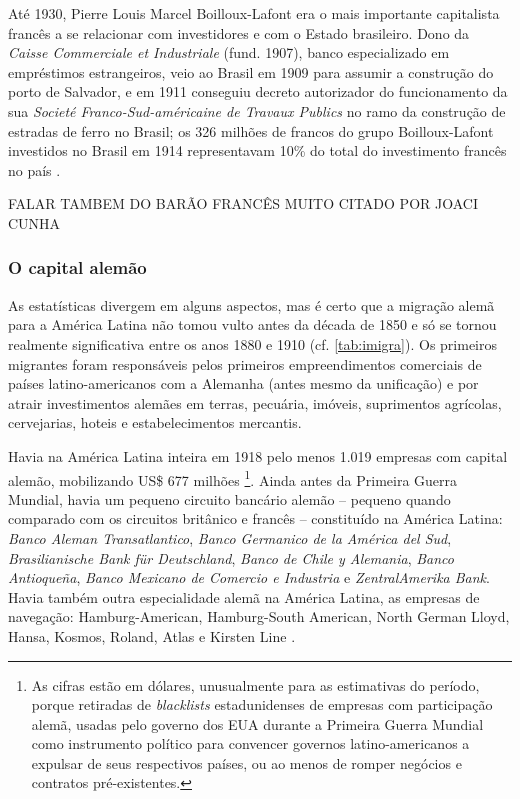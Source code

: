 Até 1930, Pierre Louis Marcel Boilloux-Lafont era o mais importante capitalista francês a se relacionar com investidores e com o Estado brasileiro. Dono da \textit{Caisse Commerciale et Industriale} (fund. 1907), banco especializado em empréstimos estrangeiros, veio ao Brasil em 1909 para assumir a construção do porto de Salvador, e em 1911 conseguiu decreto autorizador do funcionamento da sua \textit{Societé Franco-Sud-américaine de Travaux Publics} no ramo da construção de estradas de ferro no Brasil; os 326 milhões de francos do grupo Boilloux-Lafont investidos no Brasil em 1914 representavam 10\% do total do investimento francês no país \cite{somogyi_lafont_1990}.

FALAR TAMBEM DO BARÃO FRANCÊS MUITO CITADO POR JOACI CUNHA

\subsubsection{O capital alemão}\label{subsubsec:capale}

As estatísticas divergem em alguns aspectos, mas é certo que a migração alemã para a América Latina não tomou vulto antes da década de 1850 \cite[p.~65]{rippy_german_1948} e só se tornou realmente significativa entre os anos 1880 e 1910 (cf. \autoref{tab:imigra}). Os primeiros migrantes foram responsáveis pelos primeiros empreendimentos comerciais de países latino-americanos com a Alemanha (antes mesmo da unificação) e por atrair investimentos alemães em terras, pecuária, imóveis, suprimentos agrícolas, cervejarias, hoteis e estabelecimentos mercantis. 

Havia na América Latina inteira em 1918 pelo menos 1.019 empresas com capital alemão, mobilizando US\$ 677 milhões \cite[p.~64-65]{rippy_german_1948}\footnote{As cifras estão em dólares, unusualmente para as estimativas do período, porque retiradas de \textit{blacklists} estadunidenses de empresas com participação alemã, usadas pelo governo dos EUA durante a Primeira Guerra Mundial como instrumento político para convencer governos latino-americanos a expulsar de seus respectivos países, ou ao menos de romper negócios e contratos pré-existentes.}. Ainda antes da Primeira Guerra Mundial, havia um pequeno circuito bancário alemão -- pequeno quando comparado com os circuitos britânico e francês -- constituído na América Latina: \textit{Banco Aleman Transatlantico}, \textit{Banco Germanico de la América del Sud}, \textit{Brasilianische Bank für Deutschland}, \textit{Banco de Chile y Alemania}, \textit{Banco Antioqueña}, \textit{Banco Mexicano de Comercio e Industria} e \textit{ZentralAmerika Bank}. Havia também outra especialidade alemã na América Latina, as empresas de navegação: Hamburg-American, Hamburg-South American, North German Lloyd, Hansa, Kosmos, Roland, Atlas e Kirsten Line \cite{rippy_german_1948}.

